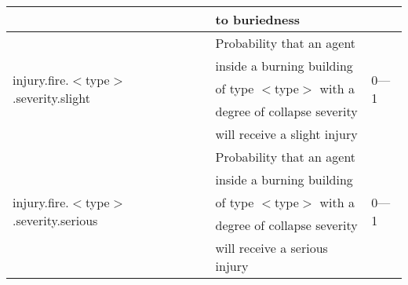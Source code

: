 \documentclass{article}
\begin{document}
\begin{table}[htb]
\begin{tabular}{lll}
                                                            & to buriedness    
                                        & \\
  \hline
  \multirow{5}{*}{injury.fire.$<$type$>$.severity.slight}   &  Probability that
  an agent                              & \multirow{5}{*}{0---1}\\
                                                            & inside a burning
  building                              & \\
                                                            & of type $<$type$>$
  with a                                & \\
                                                            & degree of collapse
  severity                              & \\
                                                            & will receive a
  slight injury                         & \\
  \hline
  \multirow{5}{*}{injury.fire.$<$type$>$.severity.serious}  &  Probability that
  an agent                              & \multirow{5}{*}{0---1}\\
                                                            & inside a burning
  building                              & \\
                                                            & of type $<$type$>$
  with a                                & \\
                                                            & degree of collapse
  severity                              & \\
                                                            & will receive a
  serious injury                        & \\
  \hline
\end{tabular}
\end{table}
\end{document}
